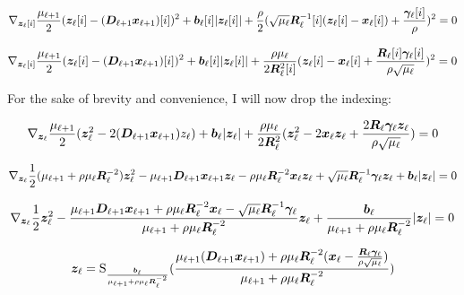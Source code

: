 \begin{equation}
\nabla_{\bm{z}_{\ell}[i]} \frac{\mu_{\ell + 1}}{2}(\bm{z}_{\ell}[i] - (\bm{D}_{\ell + 1}\bm{x}_{\ell + 1})[i])^2 + \bm{b}_{\ell}[i]|\bm{z}_{\ell}[i]| + \frac{\rho}{2} (\sqrt{\mu_{\ell}}\bm{R}_{\ell}^{-1}[i](\bm{z}_{\ell}[i] - \bm{x}_{\ell}[i]) + \frac{\bm{\gamma}_{\ell}[i]}{\rho})^2 = 0
\end{equation}


\begin{equation}
\nabla_{\bm{z}_{\ell}[i]} \frac{\mu_{\ell + 1}}{2}(\bm{z}_{\ell}[i] - (\bm{D}_{\ell + 1}\bm{x}_{\ell + 1})[i])^2 + \bm{b}_{\ell}[i]|\bm{z}_{\ell}[i]| + \frac{\rho\mu_{\ell}}{2\bm{R}_{\ell}^2[i]} (\bm{z}_{\ell}[i] - \bm{x}_{\ell}[i] + \frac{\bm{R}_{\ell}[i]\bm{\gamma}_{\ell}[i]}{\rho\sqrt{\mu_{\ell}}})^2 = 0
\end{equation}

For the sake of brevity and convenience, I will now drop the indexing:

\begin{equation}
\nabla_{\bm{z}_{\ell}} \frac{\mu_{\ell + 1}}{2}(\bm{z}_{\ell}^2 - 2(\bm{D}_{\ell + 1}\bm{x}_{\ell + 1})z_{\ell}) + \bm{b}_{\ell}|\bm{z}_{\ell}| + \frac{\rho\mu_{\ell}}{2\bm{R}_{\ell}^2} (\bm{z}_{\ell}^2 - 2\bm{x}_{\ell}\bm{z}_{\ell} + \frac{2\bm{R}_{\ell}\bm{\gamma}_{\ell}\bm{z}_{\ell}}{\rho\sqrt{\mu_{\ell}}}) = 0
\end{equation}

\begin{equation}
\nabla_{\bm{z}_{\ell}} \frac{1}{2}(\mu_{\ell + 1} + \rho\mu_{\ell}\bm{R}_{\ell}^{-2})\bm{z}_{\ell}^2 - \mu_{\ell + 1}\bm{D}_{\ell + 1}\bm{x}_{\ell + 1}\bm{z}_{\ell} - \rho\mu_{\ell}\bm{R}_{\ell}^{-2}\bm{x}_{\ell}\bm{z}_{\ell} + \sqrt{\mu_{\ell}}\bm{R}_{\ell}^{-1}\bm{\gamma}_{\ell}\bm{z}_{\ell} + \bm{b}_{\ell}|\bm{z}_{\ell}| = 0
\end{equation}

\begin{equation}
\nabla_{\bm{z}_{\ell}} \frac{1}{2}\bm{z}_{\ell}^2 - \frac{\mu_{\ell + 1}\bm{D}_{\ell + 1}\bm{x}_{\ell + 1} + \rho\mu_{\ell}\bm{R}_{\ell}^{-2}\bm{x}_{\ell} - \sqrt{\mu_{\ell}}\bm{R}_{\ell}^{-1}\bm{\gamma}_{\ell}}{\mu_{\ell + 1} + \rho\mu_{\ell}\bm{R}_{\ell}^{-2}}\bm{z}_{\ell} + \frac{\bm{b}_{\ell}}{\mu_{\ell + 1} + \rho\mu_{\ell}\bm{R}_{\ell}^{-2}}|\bm{z}_{\ell}| = 0
\end{equation}

\begin{equation}
\bm{z}_{\ell} = \operatorname{S}_{\frac{\bm{b}_{\ell}}{\mu_{\ell + 1} + \rho\mu_{\ell}\bm{R}_{\ell}^{-2}}}(\frac{\mu_{\ell + 1}(\bm{D}_{\ell + 1}\bm{x}_{\ell + 1}) + \rho\mu_{\ell}\bm{R}_{\ell}^{-2}(\bm{x}_{\ell} - \frac{\bm{R}_{\ell}\bm{\gamma}_{\ell}}{\rho\sqrt{\mu_{\ell}}})}{\mu_{\ell + 1} + \rho\mu_{\ell}\bm{R}_{\ell}^{-2}})
\end{equation}


